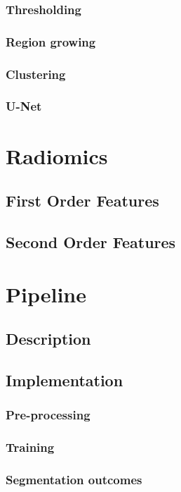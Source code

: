 \documentclass[12pt,a4paper]{report}
\begin{document}
\subsection{Thresholding}
\subsection{Region growing}
\subsection{Clustering}
\subsection{U-Net}


\chapter{Radiomics}


\section{First Order Features}
\section{Second Order Features}



\chapter{Pipeline}


\section{Description}

\section{Implementation}

\subsection{Pre-processing}
\subsection{Training}
\subsection{Segmentation outcomes}
\end{document}
